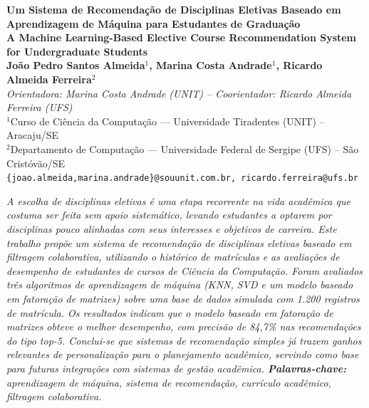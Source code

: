 \documentclass[a4paper,12pt]{article}
\newenvironment{resumo}{%
  \list{}{\advance\topsep by6pt\relax
    \leftmargin=0.8cm
    \labelwidth=0pt
    \listparindent=0pt
    \itemindent\listparindent
    \rightmargin\leftmargin}\item[\hskip\labelsep\bfseries\itshape Resumo.]\itshape}%
  {\endlist}
\begin{document}
\pagestyle{empty}

\begin{center}
  {\fontsize{16}{20}\selectfont\bfseries Um Sistema de Recomendação de Disciplinas Eletivas Baseado em Aprendizagem de Máquina para Estudantes de Graduação}\\[4pt]
  {\fontsize{14}{18}\selectfont\bfseries A Machine Learning-Based Elective Course Recommendation System for Undergraduate Students}\\[12pt]

  {\normalsize\bfseries João Pedro Santos Almeida$^{1}$, Marina Costa Andrade$^{1}$, Ricardo Almeida Ferreira$^{2}$}\\[6pt]
  {\footnotesize\itshape Orientadora: Marina Costa Andrade (UNIT) -- Coorientador: Ricardo Almeida Ferreira (UFS)}\\[4pt]

  {\normalsize
    $^{1}$Curso de Ciência da Computação — Universidade Tiradentes (UNIT) -- Aracaju/SE\\{}
    $^{2}$Departamento de Computação — Universidade Federal de Sergipe (UFS) -- São Cristóvão/SE\\{}
    \footnotesize\texttt{\{joao.almeida,marina.andrade\}@souunit.com.br, ricardo.ferreira@ufs.br}
  }
\end{center}
\vspace{12pt}

\begin{resumo}
A escolha de disciplinas eletivas é uma etapa recorrente na vida acadêmica
que costuma ser feita sem apoio sistemático, levando estudantes a optarem
por disciplinas pouco alinhadas com seus interesses e objetivos de
carreira. Este trabalho propõe um sistema de recomendação de disciplinas
eletivas baseado em filtragem colaborativa, utilizando o histórico de
matrículas e as avaliações de desempenho de estudantes de cursos de
Ciência da Computação. Foram avaliados três algoritmos de aprendizagem de
máquina (KNN, SVD e um modelo baseado em fatoração de matrizes) sobre uma
base de dados simulada com 1.200 registros de matrícula. Os resultados
indicam que o modelo baseado em fatoração de matrizes obteve o melhor
desempenho, com precisão de 84,7\% nas recomendações do tipo top-5.
Conclui-se que sistemas de recomendação simples já trazem ganhos
relevantes de personalização para o planejamento acadêmico, servindo como
base para futuras integrações com sistemas de gestão acadêmica.
\end{resumo}
\noindent\textbf{Palavras-chave:} aprendizagem de máquina, sistema de recomendação, currículo acadêmico, filtragem colaborativa.
\end{document}
